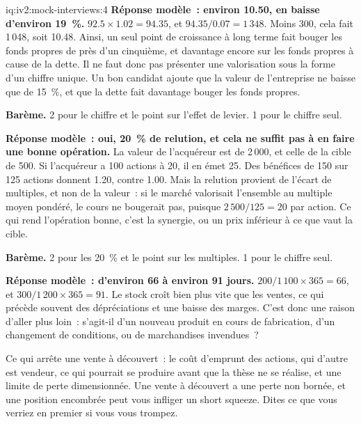 \begin{solution}{iq:iv2:mock-interviews:4}
\ivstop
\textbf{Réponse modèle~: environ 10.50, en baisse d'environ 19~\%.} $92.5 \times 1.02 = 94.35$, et $94.35/0.07 = 1\,348$. Moins 300, cela fait 1\,048, soit 10.48. Ainsi, un seul point de croissance à long terme fait bouger les fonds propres de près d'un cinquième, et davantage encore sur les fonds propres à cause de la dette. Il ne faut donc pas présenter une valorisation sous la forme d'un chiffre unique. Un bon candidat ajoute que la valeur de l'entreprise ne baisse que de 15~\%, et que la dette fait davantage bouger les fonds propres.

\textbf{Barème.} 2 pour le chiffre et le point sur l'effet de levier. 1 pour le chiffre seul.

\ivstop
\textbf{Réponse modèle~: oui, 20~\% de relution, et cela ne suffit pas à en faire une bonne opération.} La valeur de l'acquéreur est de 2\,000, et celle de la cible de 500. Si l'acquéreur a 100 actions à 20, il en émet 25. Des bénéfices de 150 sur 125 actions donnent 1.20, contre 1.00. Mais la relution provient de l'écart de multiples, et non de la valeur~: si le marché valorisait l'ensemble au multiple moyen pondéré, le cours ne bougerait pas, puisque $2\,500/125 = 20$ par action. Ce qui rend l'opération bonne, c'est la synergie, ou un prix inférieur à ce que vaut la cible.

\textbf{Barème.} 2 pour les 20~\% et le point sur les multiples. 1 pour le chiffre seul.

\ivstop
\textbf{Réponse modèle~: d'environ 66 à environ 91 jours.} $200/1\,100 \times 365 = 66$, et $300/1\,200 \times 365 = 91$. Le stock croît bien plus vite que les ventes, ce qui précède souvent des dépréciations et une baisse des marges. C'est donc une raison d'aller plus loin~: s'agit-il d'un nouveau produit en cours de fabrication, d'un changement de conditions, ou de marchandises invendues~?

Ce qui arrête une vente à découvert~: le coût d'emprunt des actions, qui d'autre est vendeur, ce qui pourrait se produire avant que la thèse ne se réalise, et une limite de perte dimensionnée. Une vente à découvert a une perte non bornée, et une position encombrée peut vous infliger un short squeeze. Dites ce que vous verriez en premier si vous vous trompez.


\end{solution}
